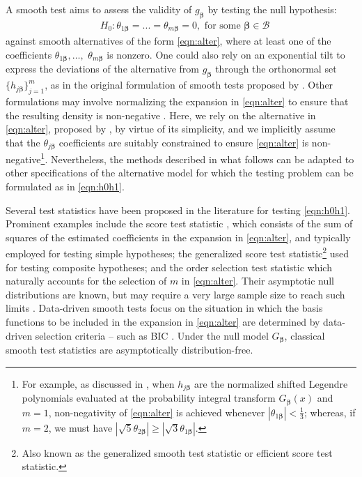 \documentclass[11pt]{article}
\newcommand{\vect}[1]{\boldsymbol{#1}}
\begin{document}
A smooth test aims to assess the validity of $g_{\vect{\beta}}$ by testing the null hypothesis:
\begin{equation}
    \begin{aligned}
   &H_0:  \theta_{1\vect{\beta}}=...=\theta_{m\vect{\beta}}=0, \text{ for some }\vect{\beta}\in \mathcal{B} 
\label{eqn:h0h1}
    \end{aligned}
\end{equation}
against smooth alternatives of the form \eqref{eqn:alter}, where at least one of the coefficients $\theta_{1\vect{\beta}},\ldots,$ $\theta_{m\vect{\beta}}$ is nonzero.
One could also rely on an exponential tilt to express the deviations of the alternative from $g_{\vect{\beta}}$ through the orthonormal set $\{h_{j\vect{\beta}}\}_{j=1}^m$, as in the original formulation of smooth tests proposed by \citet{neyman1937}. Other formulations may involve normalizing the expansion in \eqref{eqn:alter} to ensure that the resulting density is non-negative \citep[e.g.,][]{gajek1986}. 
Here, we rely on the alternative in \eqref{eqn:alter},  proposed by \cite{Barton1953}, by virtue of its simplicity, and we implicitly assume that the $\theta_{j\vect{\beta}}$ coefficients are suitably constrained to ensure \eqref{eqn:alter} is non-negative\footnote{For example,  as discussed in \cite{Barton1953}, when $h_{j\vect{\beta}}$ are the normalized shifted Legendre polynomials evaluated at the probability integral transform $G_{\vect{\beta}}(x)$ and $m=1$, non-negativity of \eqref{eqn:alter} is achieved whenever $|\theta_{1\vect{\beta}}|<\frac{1}{3}$; whereas, if $m=2$, we must have $|\sqrt{5}\theta_{2\vect{\beta}}|\geq |\sqrt{3}\theta_{1\vect{\beta}}|$.}. 
Nevertheless, the methods described in what follows can be adapted to other specifications of the alternative model for which the testing problem can be formulated as in \eqref{eqn:h0h1}.
 


Several test statistics have been proposed in the literature for testing \eqref{eqn:h0h1}. Prominent examples include the score test statistic \citep[][]{neyman1937, Barton1953}, which consists of the sum of squares of the estimated coefficients in the expansion in \eqref{eqn:alter}, and typically employed for testing simple hypotheses; the generalized score test statistic\footnote{Also known as the generalized smooth test statistic or efficient score test statistic.} \citep[][]{javitz1975generalized, david1979} used for testing composite hypotheses; and the order selection test statistic \citep[][]{marc1999} which naturally accounts for the selection of $m$ in \eqref{eqn:alter}. Their asymptotic null distributions are known, but may require a very large sample size to reach such limits \citep{Klar2000}. 
Data-driven smooth tests \citep{Led1994} focus on the situation in which the basis functions to be included in the expansion in \eqref{eqn:alter} are determined by data-driven selection criteria -- such as BIC \citep[e.g.,][]{Led1994,kall1995a,kall1997jasa, Inglot1997,inglot2006atowards}. 
Under the null model $G_{\vect{\beta}}$, classical smooth test statistics are asymptotically distribution-free.
\end{document}
